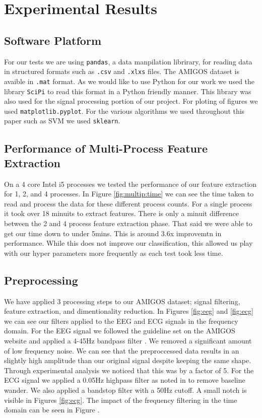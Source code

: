 \section{Experimental Results}
\label{sec:experimental_results}
\subsection{Software Platform}
For our tests we are using \texttt{pandas},
a data manpilation librirary,
for reading data in structured formats such as
\texttt{.csv} and \texttt{.xlxs} files.
The AMIGOS dataset is avaible in \texttt{.mat} format.
As we would like to use Python for our work we used
the library \texttt{SciPi} to read this format in a Python friendly manner.
This library was also used for the signal processing portion of our project.
For ploting of figures we used \texttt{matplotlib.pyplot}.
For the various algorithms we used throughout this paper such as SVM we
used \texttt{sklearn}.


\subsection{Performance of Multi-Process Feature Extraction}
On a 4 core Intel i5 processes we tested the performance of our feature extraction
for 1, 2, and 4 processes.
In Figure \ref{fig:multip:time} we can see the time taken to read and process
the data for these different process counts.
For a single process it took over 18 minuits to extract features.
There is only a minuit difference between the 2 and 4 process feature extraction phase.
That said we were able to get our time down to under 5mins.
This is around 3.6x improvemtn in performance.
While this does not improve our classification, this allowed us play
with our hyper parameters more frequently as each test took less time.


\subsection{Preprocessing}
We have applied 3 processing steps to our AMIGOS dataset;
signal filtering, feature extraction, and dimentionality reduction.
In Figures \ref{fig:eeg} and \ref{fig:ecg}
we can see our filters applied to the EEG and ECG signals in the frequency domain.
For the EEG signal we followed the guideline set on the AMIGOS
website and applied a 4-45Hz bandpass filter \cite{AMIGOS:2018}.
We removed a significant amount of low frequency noise.
We can see that the preproccessed data results
in an slightly high amplitude than our original signal despite keeping the same shape.
Through experimental analysis we noticed that this was by a factor of 5.
For the ECG signal we applied a 0.05Hz highpass filter as noted in
\cite{SantamariaGranados:2019}
to remove baseline wander.
We also applied a bandstop filter with a 50Hz cutoff.
A small notch is visible in
Figures \ref{fig:ecg}.
The impact of the frequency filtering in the time domain can be seen in Figure
\label{fig:ecg:time}.

